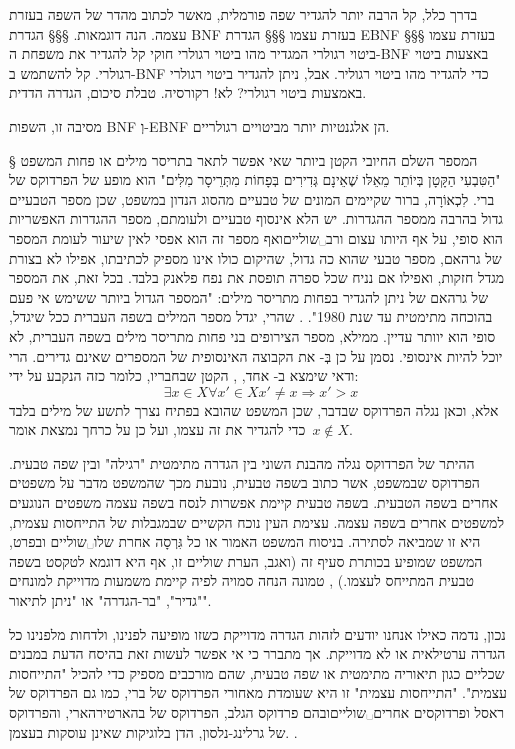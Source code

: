 בדרך כלל, קל הרבה יותר להגדיר שפה פורמלית, מאשר לכתוב מהדר של השפה בעזרת עצמה.
הנה דוגמאות.
​§§§ הגדרת BNF בעזרת עצמו
​§§§ הגדרת EBNF בעזרת עצמו
​§§§ ביטוי רגולרי המגדיר מהו ביטוי רגולרי חוקי
קל להגדיר את משפחת ה-BNF באצעות ביטוי רגולרי.
קל להשתמש ב-BNF כדי להגדיר מהו ביטוי רגוליר.
אבל, ניתן להגדיר ביטוי רגולרי באמצעות ביטוי רגולרי? לא! רקורסיה.
טבלת סיכום, הגדרה הדדית.

מסיבה זו, השפות BNF וְ-EBNF הן אלגנטיות יותר מביטויים רגולריים.

​§​ המספר השלם החיובי הקטן ביותר שאי אפשר לתאר בתריסר מילים או פחות
המשפט "הַטִּבְעִי הַקָּטָן בְּיוֹתֵר מֵאֵלּו שֶׁאֵינָם גְּדִירִים בְּפָחוֹת מִתְּרֵיסָר מִלִּים" הוא מופע של הפרדוקס של ברי. לִכְאוֹרָה, ברור שקיימים המונים של טבעיים מהסוג הנדון במשפט, שכן מספר הטבעיים גדול בהרבה ממספר ההגדרות. יש הלא אינסוף טבעיים ולעומתם, מספר ההגדרות האפשריות הוא סופי, על אף היותו עצום ורב␣שוליים{ואף מספר זה הוא אפסי לאין שיעור לעומת המספר של גרהאם, מספר טבעי שהוא כה גדול, שהיקום כולו אינו מספיק לכתיבתו, אפילו לא בצורת מגדל חזקות, ואפילו אם נניח שכל ספרה תופסת את נפח פלאנק בלבד. בכל זאת, את המספר של גרהאם של ניתן להגדיר בפחות מתריסר מילים: "המספר הגדול ביותר ששימש אי פעם בהוכחה מתימטית עד שנת 1980".
}. שהרי, יגדל מספר המילים בשפה העברית ככל שיגדל, סופי הוא יוותר עדיין. ממילא, מספר הצירופים בני פחות מתריסר מילים בשפה העברית, לא יוכל להיות אינסופי.
נסמן על כן בְּ- את הקבוצה האינסופית של המספרים שאינם גדירים. הרי ודאי שימצא ב- אחד, , הקטן שבחבריו, כלומר כזה  הנקבע על ידי: \[
∃ x∈X\mbox{}∀ x'∈X\mbox{}x'≠x\mbox{}⇒ x'>x
\] אלא, וכאן נגלה הפרדוקס שבדבר, שכן המשפט שהובא בפתיח נצרך לתשע של מילים בלבד כדי להגדיר את  זה עצמו, ועל כן על כרחך נמצאת אומר~$x∉ X$.

ההיתר של הפרדוקס נגלה מהבנת השוני בין הגדרה מתימטית "רגילה" ובין שפה טבעית. הפרדוקס שבמשפט, אשר כתוב בשפה טבעית, נובעת מכך שהמשפט מדבר על משפטים אחרים בשפה הטבעית. בשפה טבעית קיימת אפשרות לנסח בשפה עצמה משפטים הנוגעים למשפטים אחרים בשפה עצמה. עצימת העין נוכח הקשיים שבמגבלות של התייחסות עצמית, היא זו שמביאה לסתירה.
בניסוח המשפט האמור או כל גִּרְסָה אחרת שלו␣שוליים{ ובפרט, המשפט שמופיע בכותרת סעיף זה (ואגב, הערת שוליים זו, אף היא דוגמא לטקסט בשפה טבעית המתייחס לעצמו.)
}, טמונה הנחה סמויה לפיה קיימת משמעות מדוייקת למונחים "גדיר", "בר-הגדרה" או "ניתן לתיאור".

נכון, נדמה כאילו אנחנו יודעים לזהות הגדרה מדוייקת כשזו מופיעה לפנינו, ולדחות מלפנינו כל הגדרה ערטילאית או לא מדוייקת. אך מתברר כי אי אפשר לעשות זאת בהיסח הדעת במבנים שכליים כגון תיאוריה מתימטית או שפה טבעית, שהם מורכבים מספיק כדי להכיל "התייחסות עצמית". "התייחסות עצמית" זו היא שעומדת מאחורי הפרדוקס של ברי, כמו גם הפרדוקס של ראסל  ופרדוקסים אחרים␣שוליים{ובהם פרדוקס הגלב, הפרדוקס של בהארטירהארי, והפרדוקס של גרלינג-נלסון, הדן בלוגיקות שאינן עוסקות בעצמן. }.

